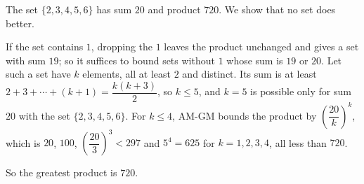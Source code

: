 The set $\{2,3,4,5,6\}$ has sum $20$ and product $720$. We show that no set does better.

If the set contains $1$, dropping the $1$ leaves the product unchanged and gives a set with sum $19$; so it suffices to bound sets without $1$ whose sum is $19$ or $20$. Let such a set have $k$ elements, all at least $2$ and distinct. Its sum is at least $2+3+\cdots+(k+1)=\dfrac{k(k+3)}{2}$, so $k\le5$, and $k=5$ is possible only for sum $20$ with the set $\{2,3,4,5,6\}$. For $k\le4$, AM-GM bounds the product by $\left(\dfrac{20}{k}\right)^k$, which is $20$, $100$, $\left(\dfrac{20}{3}\right)^3<297$ and $5^4=625$ for $k=1,2,3,4$, all less than $720$.

So the greatest product is $\boxed{720}$.
